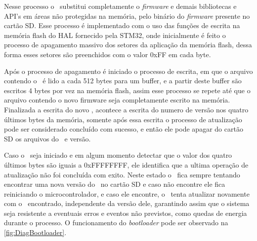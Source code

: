 Nesse processo o \bootloader\ substitui completamente o \textit{firmware} e demais bibliotecas e API's em áreas não protegidas na memória, pelo binário do \textit{firmware} presente no cartão SD. Esse processo é implementado com o uso das funções de escrita na memória flash do HAL fornecido pela STM32, onde inicialmente é feito o processo de apagamento massivo dos setores da aplicação da memória flash, dessa forma esses setores são preenchidos com o valor 0xFF em cada byte.

Após o processo de apagamento é iniciado o processo de escrita, em que o arquivo contendo o \firmware\ é lido a cada 512 bytes para um buffer, e a partir deste buffer são escritos 4 bytes por vez na memória flash, assim esse processo se repete até que o arquivo contendo o novo firmware seja completamente escrito na memória.
Finalizada a escrita do novo \firmware, acontece a escrita do numero de versão nos quatro últimos bytes da memória, somente após essa escrita o processo de atualização pode ser considerado concluído com sucesso, e então ele pode apagar do cartão SD os arquivos do \firmware\ e versão.

Caso o \bootloader\ seja iniciado e em algum momento detectar que o valor dos quatro últimos bytes são iguais a 0xFFFFFFFF, ele identifica que a ultima operação de atualização não foi concluída com exito. Neste estado o \bootloader\ fica sempre tentando encontrar uma nova versão do \firmware\ no cartão SD e caso não encontre ele fica reiniciando o microcontrolador, e caso ele encontre, o \bootloader\ tenta atualizar novamente com o \firmware\ encontrado, independente da versão dele, garantindo assim que o sistema seja resistente a eventuais erros e eventos não previstos, como quedas de energia durante o processo. O funcionamento do \textit{bootloader} pode ser observado na \autoref{fig:DiagBootloader}.

